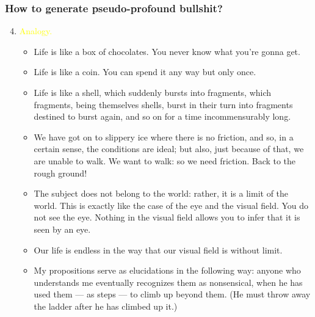 \documentclass[UTF8,aspectratio=43,11pt,colorlinks,compress,openany]{beamer}%
\begin{document}
\begin{frame}\frametitle{How to generate pseudo-profound bullshit?}\vspace{-30pt}
	\begin{enumerate}\setcounter{enumi}{3}
		\item \textcolor{yellow}{Analogy.}
		\begin{itemize}
			\item Life is like a box of chocolates. You never know what you're gonna get.
			\item Life is like a coin. You can spend it any way but only once.
			\item Life is like a shell, which suddenly bursts into fragments, which fragments, being themselves shells, burst in their turn into fragments destined to burst again, and so on for a time incommensurably long.
			\item We have got on to slippery ice where there is no friction, and so, in a certain sense, the conditions are ideal; but also, just because of that, we are unable to walk. We want to walk: so we need friction. Back to the rough ground!
			\item The subject does not belong to the world: rather, it is a limit of the world. This is exactly like the case of the eye
			and the visual field. You do not see the eye. Nothing in the visual field allows you to infer that it is seen by an eye.
			\item Our life is endless in the way that our visual field is without limit.
			\item My propositions serve as elucidations in the following
			way: anyone who understands me eventually recognizes
			them as nonsensical, when he has used them --- as
			steps --- to climb up beyond them. (He must throw away the ladder after he has climbed up it.)
		\end{itemize}
	\end{enumerate}
	\begin{center}\vspace{-2.9cm}
	\end{center}
\end{frame}
\end{document}
